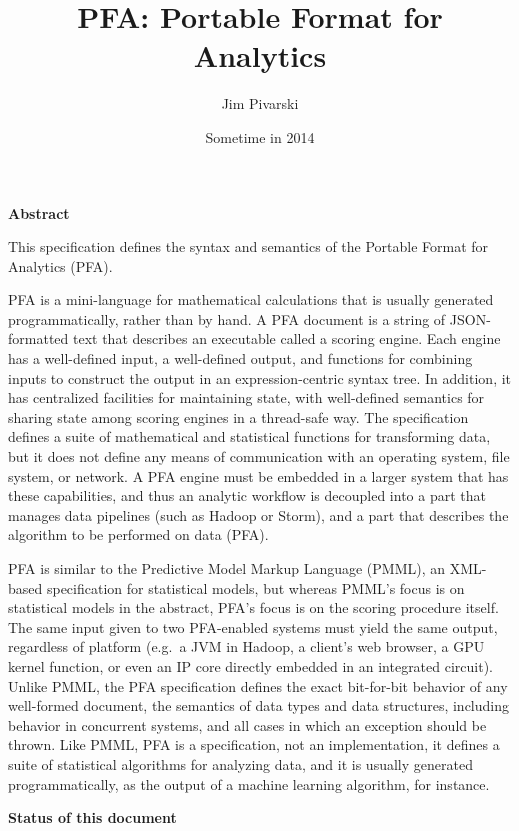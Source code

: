 \documentclass{article}
\title{PFA: Portable Format for Analytics}
\author{Jim Pivarski}
\date{Sometime in 2014}
\begin{document}
\maketitle

{\large \bf Abstract}
\vspace{0.25 cm}

This specification defines the syntax and semantics of the Portable Format for Analytics (PFA).

PFA is a mini-language for mathematical calculations that is usually generated programmatically, rather than by hand.  A PFA document is a string of JSON-formatted text that describes an executable called a scoring engine.  Each engine has a well-defined input, a well-defined output, and functions for combining inputs to construct the output in an expression-centric syntax tree.  In addition, it has centralized facilities for maintaining state, with well-defined semantics for sharing state among scoring engines in a thread-safe way.  The specification defines a suite of mathematical and statistical functions for transforming data, but it does not define any means of communication with an operating system, file system, or network.  A PFA engine must be embedded in a larger system that has these capabilities, and thus an analytic workflow is decoupled into a part that manages data pipelines (such as Hadoop or Storm), and a part that describes the algorithm to be performed on data (PFA).  

PFA is similar to the Predictive Model Markup Language (PMML), an XML-based specification for statistical models, but whereas PMML's focus is on statistical models in the abstract, PFA's focus is on the scoring procedure itself.  The same input given to two PFA-enabled systems must yield the same output, regardless of platform (e.g.\ a JVM in Hadoop, a client's web browser, a GPU kernel function, or even an IP core directly embedded in an integrated circuit).  Unlike PMML, the PFA specification defines the exact bit-for-bit behavior of any well-formed document, the semantics of data types and data structures, including behavior in concurrent systems, and all cases in which an exception should be thrown.  Like PMML, PFA is a specification, not an implementation, it defines a suite of statistical algorithms for analyzing data, and it is usually generated programmatically, as the output of a machine learning algorithm, for instance.

\vspace{0.5 cm}
{\large \bf Status of this document}
\vspace{0.25 cm}
\end{document}
